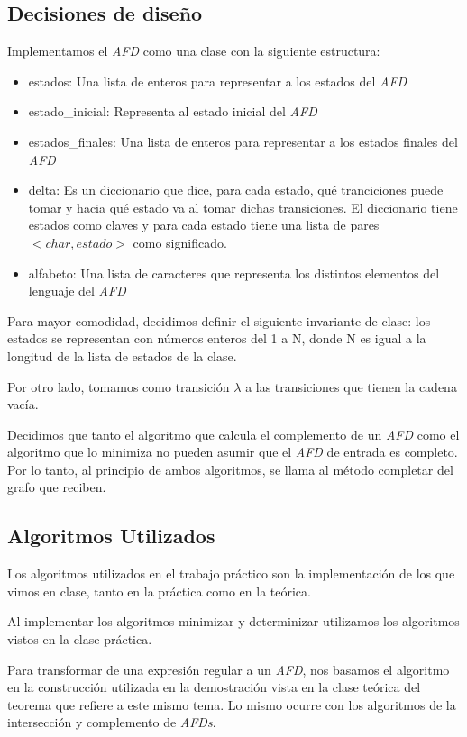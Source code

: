 \subsection{Decisiones de diseño}
Implementamos el \emph{AFD} como una clase con la siguiente estructura:

\begin{itemize}
	\item estados: Una lista de enteros para representar a los estados del \emph{AFD}
	\item estado\_inicial: Representa al estado inicial del \emph{AFD}
	\item estados\_finales: Una lista de enteros para representar a los estados finales del \emph{AFD}
	\item delta: Es un diccionario que dice, para cada estado, qué tranciciones puede tomar y hacia qué estado va al tomar dichas transiciones. El diccionario tiene estados como claves y para cada estado tiene una lista de pares $<char, estado>$ como significado.
	\item alfabeto: Una lista de caracteres que representa los distintos elementos del lenguaje del \emph{AFD}
\end{itemize}

Para mayor comodidad, decidimos definir el siguiente invariante de clase: los estados se representan con números enteros del 1 a N, donde N es igual a la longitud de la lista de estados de la clase.

Por otro lado, tomamos como transición $\lambda$ a las transiciones que tienen la cadena vacía.

Decidimos que tanto el algoritmo que calcula el complemento de un \emph{AFD} como el algoritmo que lo minimiza no pueden asumir que el \emph{AFD} de entrada es completo. Por lo tanto, al principio de ambos algoritmos, se llama al método completar del grafo que reciben.

\subsection{Algoritmos Utilizados}

Los algoritmos utilizados en el trabajo práctico son la implementación de los que vimos en clase, tanto en la práctica como en la teórica.

Al implementar los algoritmos minimizar y determinizar utilizamos los algoritmos vistos en la clase práctica.

Para transformar de una expresión regular a un \emph{AFD}, nos basamos el algoritmo en la construcción utilizada en la demostración vista en la clase teórica del teorema que refiere a este mismo tema. Lo mismo ocurre con los algoritmos de la intersección y complemento de \emph{AFDs}.

